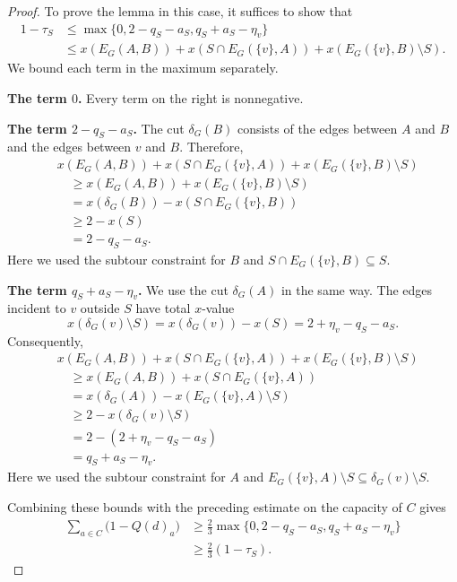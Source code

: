 \documentclass[11pt]{amsart}
\newcommand{\1}{\mathbbm{1}}
\begin{document}
\begin{proof}
To prove the lemma in this case, it suffices to show that
\[
 \begin{aligned}
 1-\tau_S
 &\le\max\{0,2-q_S-a_S,q_S+a_S-\eta_v\}\\
 &\le x(E_G(A,B))+x(S\cap E_G(\{v\},A))+x(E_G(\{v\},B)\setminus S).
 \end{aligned}
\]
We bound each term in the maximum separately.

\smallskip\noindent
\textbf{The term $0$.}
Every term on the right is nonnegative.

\smallskip\noindent
\textbf{The term $2-q_S-a_S$.}
The cut $\delta_G(B)$ consists of the edges between $A$
and $B$ and the edges between $v$ and $B$. Therefore,
\[
 \begin{aligned}
 &x(E_G(A,B))
  +x(S\cap E_G(\{v\},A))
  +x(E_G(\{v\},B)\setminus S)\\
 &\quad\ge x(E_G(A,B))
           +x(E_G(\{v\},B)\setminus S)\\
 &\quad=x(\delta_G(B))-x(S\cap E_G(\{v\},B))\\
 &\quad\ge2-x(S)\\
 &\quad=2-q_S-a_S.
 \end{aligned}
\]
Here we used the subtour constraint for $B$ and
$S\cap E_G(\{v\},B)\subseteq S$.

\smallskip\noindent
\textbf{The term $q_S+a_S-\eta_v$.}
We use the cut $\delta_G(A)$ in the same way.
The edges incident to $v$ outside $S$ have total $x$-value
\[
 x(\delta_G(v)\setminus S)
 =x(\delta_G(v))-x(S)
 =2+\eta_v-q_S-a_S.
\]
Consequently,
\[
 \begin{aligned}
 &x(E_G(A,B))
  +x(S\cap E_G(\{v\},A))
  +x(E_G(\{v\},B)\setminus S)\\
 &\quad\ge x(E_G(A,B))
           +x(S\cap E_G(\{v\},A))\\
 &\quad=x(\delta_G(A))-x(E_G(\{v\},A)\setminus S)\\
 &\quad\ge2-x(\delta_G(v)\setminus S)\\
 &\quad=2-(2+\eta_v-q_S-a_S)\\
 &\quad=q_S+a_S-\eta_v.
 \end{aligned}
\]
Here we used the subtour constraint for $A$ and
$E_G(\{v\},A)\setminus S\subseteq\delta_G(v)\setminus S$.

Combining these bounds with the preceding estimate on the
capacity of $C$ gives
\[
 \begin{aligned}
 \sum_{a\in C}\bigl(1-{Q(d)}_a\bigr)
 &\ge\frac23\max\{0,2-q_S-a_S,q_S+a_S-\eta_v\}\\
 &\ge\frac23(1-\tau_S).
 \end{aligned}
\]


\end{proof}
\end{document}
